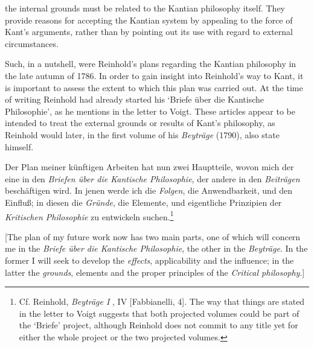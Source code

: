 the internal grounds must be related to the Kantian philosophy itself. They provide reasons for accepting the Kantian system by appealing to the force of Kant's arguments, rather than by pointing out its use with regard to external circumstances. 

Such, in a nutshell, were Reinhold's plans regarding the Kantian philosophy in the late autumn of 1786. In order to gain insight into Reinhold's way to Kant, it is important to assess the extent to which this plan was carried out. At the time of writing Reinhold had already started his `Briefe \"{u}ber die Kantische Philosophie', as he mentions in the letter to Voigt. These articles appear to be intended to treat the external grounds or results of Kant's philosophy, as Reinhold would later, in the first volume of his \textit{Beytr\"{a}ge} (1790), also state himself. 

Der Plan meiner k\"{u}nftigen Arbeiten hat nun zwei Hauptteile, wovon mich der eine in den\textit{ Briefen \"{u}ber die Kantische Philosophie}, der andere in den \textit{Beitr\"{a}gen} besch\"{a}ftigen wird. In jenen werde ich die \textit{Folgen}, die Anwendbarkeit, und den Einflu\ss{}; in diesen die \textit{Gr\"{u}nde}, die Elemente, und eigentliche Prinzipien der \textit{Kritischen Philosophie} zu entwickeln suchen.\footnote{ Cf. Reinhold, \textit{Beytr\"{a}ge I} , IV [Fabbianelli, 4]. The way that things are stated in the letter to Voigt suggests that both projected volumes could be part of the `Briefe' project, although Reinhold does not commit to any title yet for either the whole project or the two projected volumes. } 

[The plan of my future work now has two main parts, one of which will concern me in the \textit{Briefe \"{u}ber die Kantische Philosophie}, the other in the \textit{Beytr\"{a}ge}. In the former I will seek to develop the \textit{effects}, applicability and the influence; in the latter the \textit{grounds}, elements and the proper principles of the \textit{Critical philosophy}.] 

